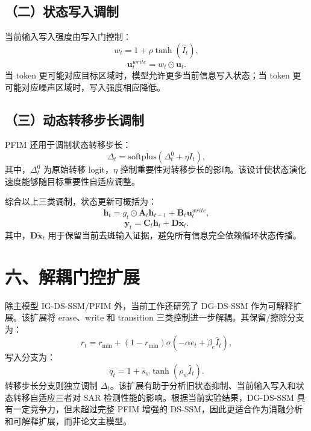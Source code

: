 \documentclass[UTF8,10pt]{ctexart}
\begin{document}
\subsection*{（二）状态写入调制}

当前输入写入强度由写入门控制：
\begin{equation}
  w_t=1+\rho\tanh(\hat{I}_t),
\end{equation}
\begin{equation}
  \mathbf{u}^{write}_t=w_t\odot\mathbf{u}_t.
\end{equation}
当 token 更可能对应目标区域时，模型允许更多当前信息写入状态；当 token 更可能对应噪声区域时，写入强度相应降低。

\subsection*{（三）动态转移步长调制}

PFIM 还用于调制状态转移步长：
\begin{equation}
  \Delta_t=\mathrm{softplus}(\Delta_t^0+\eta I_t),
\end{equation}
其中，$\Delta_t^0$ 为原始转移 logit，$\eta$ 控制重要性对转移步长的影响。该设计使状态演化速度能够随目标重要性自适应调整。

综合以上三类调制，状态更新可概括为：
\begin{equation}
  \mathbf{h}_t
  =g_t\odot\bar{\mathbf{A}}_t\mathbf{h}_{t-1}
  +\bar{\mathbf{B}}_t\mathbf{u}^{write}_t,
\end{equation}
\begin{equation}
  \mathbf{y}_t=\mathbf{C}_t\mathbf{h}_t+\mathbf{D}\widetilde{\mathbf{x}}_t.
\end{equation}
其中，$\mathbf{D}\widetilde{\mathbf{x}}_t$ 用于保留当前去斑输入证据，避免所有信息完全依赖循环状态传播。

\section*{六、解耦门控扩展}

除主模型 IG-DS-SSM/PFIM 外，当前工作还研究了 DG-DS-SSM 作为可解释扩展。该扩展将 erase、write 和 transition 三类控制进一步解耦。其保留/擦除分支为：
\begin{equation}
  r_t=r_{\min}+(1-r_{\min})\sigma(-\alpha e_t+\beta_e\hat{I}_t),
\end{equation}
写入分支为：
\begin{equation}
  q_t=1+s_w\tanh(\rho_w\hat{I}_t).
\end{equation}
转移步长分支则独立调制 $\Delta_t$。该扩展有助于分析旧状态抑制、当前输入写入和状态转移自适应三者对 SAR 检测性能的影响。根据当前实验结果，DG-DS-SSM 具有一定竞争力，但未超过完整 PFIM 增强的 DS-SSM，因此更适合作为消融分析和可解释扩展，而非论文主模型。
\end{document}
